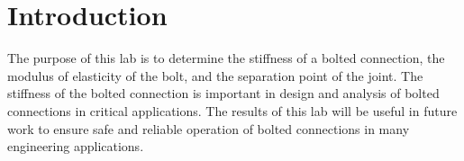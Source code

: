 \section{Introduction}
The purpose of this lab is to determine the stiffness of a bolted connection, the modulus of elasticity of the bolt, and the separation point of the joint. The stiffness of the bolted connection is important in design and analysis of bolted connections in critical applications. The results of this lab will be useful in future work to ensure safe and reliable operation of bolted connections in many engineering applications.







